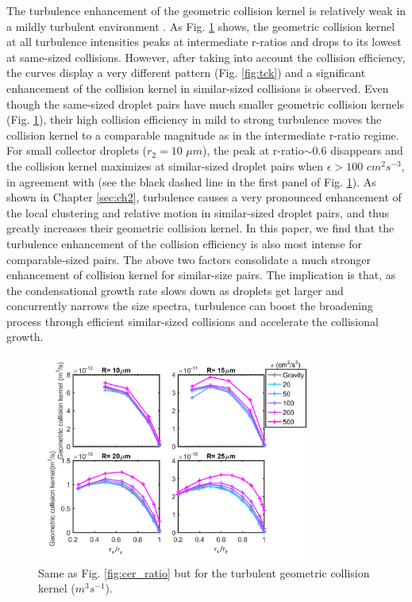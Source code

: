 The turbulence enhancement of the geometric collision kernel is relatively weak in a mildly turbulent environment \citep{Ayala2008a, Chen2016}. As Fig. \ref{fig:tgck} shows, the geometric collision kernel at all turbulence intensities peaks at intermediate r-ratios and drops to its lowest at same-sized collisions. However, after taking into account the collision efficiency, the curves display a very different pattern (Fig. \ref{fig:tck}) and a significant enhancement of the collision kernel in similar-sized collisions is observed. Even though the same-sized droplet pairs have much smaller geometric collision kernels (Fig. \ref{fig:tgck}), their high collision efficiency in mild to strong turbulence moves the collision kernel to a comparable magnitude as in the intermediate r-ratio regime. For small collector droplets ($r_2 = 10$ $\mu m$), the peak at r-ratio$\sim 0.6$ disappears and the collision kernel maximizes at similar-sized droplet pairs when $\epsilon > 100$ $cm^2s^{-3}$, in agreement with \citet{Pinsky2008} (see the black dashed line in the first panel of Fig. \ref{fig:tgck}). As shown in Chapter \ref{sec:ch2}, turbulence causes a very pronounced enhancement of the local clustering and relative motion in similar-sized droplet pairs, and thus greatly increases their geometric collision kernel. In this paper, we find that the turbulence enhancement of the collision efficiency is also most intense for comparable-sized pairs. The above two factors consolidate a much stronger enhancement of collision kernel for similar-size pairs. The implication is that, as the condensational growth rate slows down as droplets get larger and concurrently narrows the size spectra, turbulence can boost the broadening process through efficient similar-sized collisions and accelerate the collisional growth.

\begin{figure}[ht]
\centering
\includegraphics[width=0.8\textwidth]{Figures/Chap3/tgck.png}
\caption{Same as Fig. \ref{fig:cer_ratio} but for the turbulent geometric collision kernel ($m^3s^{-1}$).} \label{fig:tgck}
\end{figure}

